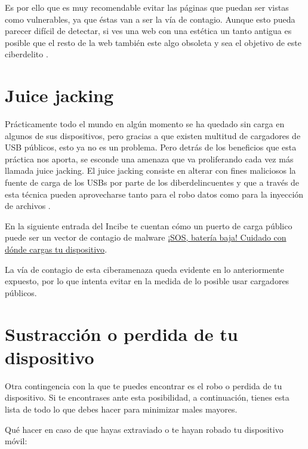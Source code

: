 \documentclass[
  a4paper,
  openany]{book}
\begin{document}
Es por ello que es muy recomendable evitar las páginas que puedan ser vistas como vulnerables, ya que éstas van a ser la vía de contagio. Aunque esto pueda parecer difícil de detectar, si ves una web con una estética un tanto antigua es posible que el resto de la web también este algo obsoleta y sea el objetivo de este ciberdelito \citep{RZ-formjacking}.

\hypertarget{juice-jacking}{%
\section{Juice jacking}\label{juice-jacking}}

Prácticamente todo el mundo en algún momento se ha quedado sin carga en algunos de sus dispositivos, pero gracias a que existen multitud de cargadores de USB públicos, esto ya no es un problema. Pero detrás de los beneficios que esta práctica nos aporta, se esconde una amenaza que va proliferando cada vez más llamada juice jacking. El juice jacking consiste en alterar con fines maliciosos la fuente de carga de los USBs por parte de los diberdelincuentes y que a través de esta técnica pueden aprovecharse tanto para el robo datos como para la inyección de archivos \citep{ESET-juice-jacking}.

En la siguiente entrada del Incibe te cuentan cómo un puerto de carga público puede ser un vector de contagio de malware \href{https://www.incibe.es/empresas/blog/sos-bateria-baja-cuidado-con-donde-cargas-tu-dispositivo}{¡SOS, batería baja! Cuidado con dónde cargas tu dispositivo}.

La vía de contagio de esta ciberamenaza queda evidente en lo anteriormente expuesto, por lo que intenta evitar en la medida de lo posible usar cargadores públicos.

\hypertarget{sustracciuxf3n-o-perdida-de-tu-dispositivo}{%
\section{Sustracción o perdida de tu dispositivo}\label{sustracciuxf3n-o-perdida-de-tu-dispositivo}}

Otra contingencia con la que te puedes encontrar es el robo o perdida de tu dispositivo. Si te encontrases ante esta posibilidad, a continuación, tienes esta lista de todo lo que debes hacer para minimizar males mayores.

Qué hacer en caso de que hayas extraviado o te hayan robado tu dispositivo móvil:
\end{document}
